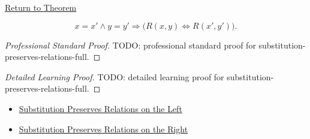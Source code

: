\newpage
{}
\label{prf:substitution-preserves-relations-full}

\begin{remark*}[Return]
\hyperref[prop:substitution-preserves-relations-full]{Return to Theorem}
\end{remark*}

\begin{proposition*}
\[
x=x' \land y=y' \Longrightarrow
\bigl(R(x,y)\Longleftrightarrow R(x',y')\bigr).
\]
\end{proposition*}

\begin{proof}[Professional Standard Proof]
\LRAProofBodyStart
TODO: professional standard proof for substitution-preserves-relations-full.
\end{proof}

\begin{proof}[Detailed Learning Proof]
\LRAProofBodyStart
TODO: detailed learning proof for substitution-preserves-relations-full.
\end{proof}

\begin{remark*}
\end{remark*}

\begin{dependencies}
\begin{itemize}
  \item \hyperref[prop:substitution-preserves-relations-left]{Substitution Preserves Relations on the Left}
  \item \hyperref[prop:substitution-preserves-relations-right]{Substitution Preserves Relations on the Right}
\end{itemize}
\end{dependencies}

\clearpage
